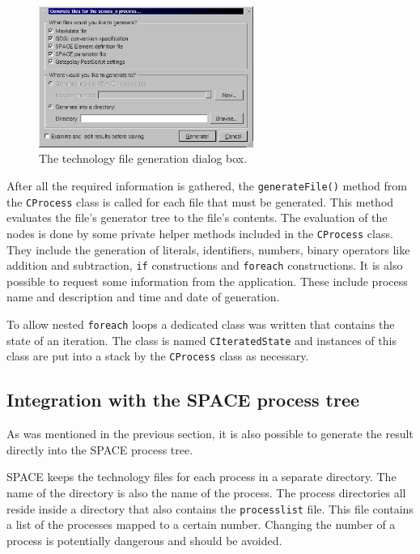 \begin{figure}[!bh] \begin{center}
\includegraphics[width=7cm]{./figures/generate.eps}
\caption{The technology file generation dialog box.}
\label{fig:design:generatedialog}
\end{center} \end{figure}
After all the required information is gathered, the \verb=generateFile()=
method from the \verb=CProcess= class is called for each file that must be
generated. This method evaluates the file's generator tree to the file's
contents. The evaluation of the nodes is done by some private helper methods
included in the \verb=CProcess= class. They include the generation of literals,
identifiers, numbers, binary operators like addition and subtraction, \verb=if=
constructions and \verb=foreach= constructions. It is also possible to request
some information from the application. These include process name and
description and time and date of generation.

To allow nested \verb=foreach= loops a dedicated class was written that
contains the state of an iteration. The class is named \verb=CIteratedState=
and instances of this class are put into a stack by the \verb=CProcess= class
as necessary.

\subsection{Integration with the SPACE process tree} \label{sect:design:integration}
As was mentioned in the previous section, it is also possible to generate the
result directly into the SPACE process tree.

SPACE keeps the technology files for each process in a separate directory. The
name of the directory is also the name of the process. The process directories
all reside inside a directory that also contains the \verb=processlist= file.
This file contains a list of the processes mapped to a certain number. Changing
the number of a process is potentially dangerous and should be avoided.

